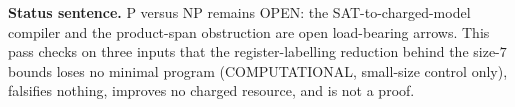 \documentclass[11pt]{article}
\begin{document}
\bigskip
\noindent\textbf{Status sentence.} P versus NP remains OPEN: the SAT-to-charged-model compiler and the product-span obstruction are open load-bearing arrows. This pass checks on three inputs that the register-labelling reduction behind the size-$7$ bounds loses no minimal program (COMPUTATIONAL, small-size control only), falsifies nothing, improves no charged resource, and is not a proof.
\end{document}
